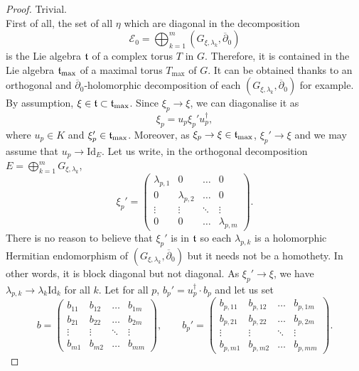 \documentclass{article}
\theoremstyle{remark}
\theoremstyle{definition}
\newcommand{\Id}{\mathrm{Id}}
\newcommand{\E}{\mathcal{E}}
\newcommand{\dbar}{\overline{\partial}}
\begin{document}
\begin{proof}
\noindent{} Trivial.\\

\noindent{} First of all, the set of all $\eta$ which are diagonal in the decomposition
$$
\E_0 = \bigoplus_{k = 1}^m (G_{\xi,\lambda_k},\dbar_0)
$$
is the Lie algebra $\frak{t}$ of a complex torus $T$ in $G$. Therefore, it is contained in the Lie algebra $\frak{t}_{\max}$ of a maximal torus $T_{\max}$ of $G$. It can be obtained thanks to an orthogonal and $\dbar_0$-holomorphic decomposition of each $(G_{\xi,\lambda_k},\dbar_0)$ for example. By assumption, $\xi \in \frak{t} \subset \frak{t}_{\max}$. Since $\xi_p \rightarrow \xi$, we can diagonalise it as
$$
\xi_p = u_p\xi_p'u_p^\dagger,
$$
where $u_p \in K$ and $\xi_p' \in \frak{t}_{\max}$. Moreover, as $\xi_p \rightarrow \xi \in \frak{t}_{\max}$, $\xi_p' \rightarrow \xi$ and we may assume that $u_p \rightarrow \Id_E$. Let us write, in the orthogonal decomposition $E = \bigoplus_{k = 1}^m G_{\xi,\lambda_k}$,
$$
\xi_p' =
\begin{pmatrix}
    \lambda_{p,1} & 0 & \hdots & 0\\
    0 & \lambda_{p,2} & \hdots & 0\\
    \vdots & \vdots & \ddots & \vdots\\
    0 & 0 & \hdots & \lambda_{p,m}
\end{pmatrix}.
$$
There is no reason to believe that $\xi_p'$ is in $\frak{t}$ so each $\lambda_{p,k}$ is a holomorphic Hermitian endomorphism of $(G_{\xi,\lambda_k},\dbar_0)$ but it needs not be a homothety. In other words, it is block diagonal but not diagonal. As $\xi_p' \rightarrow \xi$, we have $\lambda_{p,k} \rightarrow \lambda_k\Id_k$ for all $k$. Let for all $p$, $b_p' = u_p^\dagger \cdot b_p$ and let us set
$$
b =
\begin{pmatrix}
    b_{11} & b_{12} & \hdots & b_{1m}\\
    b_{21} & b_{22} & \hdots & b_{2m}\\
    \vdots & \vdots & \ddots & \vdots\\
    b_{m1} & b_{m2} & \hdots & b_{mm}
\end{pmatrix}, \qquad
b_p' = 
\begin{pmatrix}
    b_{p,11} & b_{p,12} & \hdots & b_{p,1m}\\
    b_{p,21} & b_{p,22} & \hdots & b_{p,2m}\\
    \vdots & \vdots & \ddots & \vdots\\
    b_{p,m1} & b_{p,m2} & \hdots & b_{p,mm}
\end{pmatrix}.
$$
\end{proof}
\end{document}
